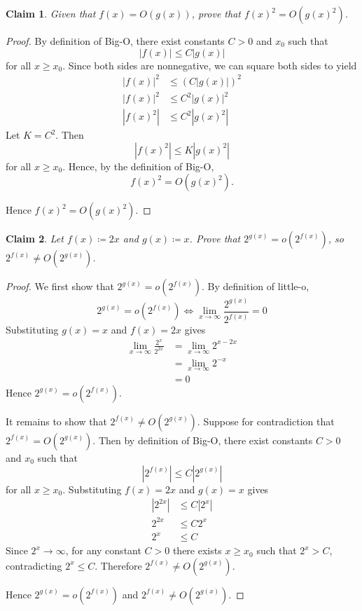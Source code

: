 \documentclass{article}
\newtheorem{claim}{Claim}
\begin{document}
\begin{claim}
    Given that $f(x) = O(g(x))$, prove that $f(x)^2 = O(g(x)^2)$.
\end{claim}

\begin{proof}
    By definition of Big-O, there exist constants $C > 0$ and $x_0$ such that
    \[
    |f(x)| \leq C|g(x)|
    \]
    for all $x \geq x_0$. Since both sides are nonnegative, we can square both 
    sides to yield
    \[
    \begin{aligned}
    |f(x)|^2 &\leq (C|g(x)|)^2 \\
    |f(x)|^2 &\leq C^2|g(x)|^2 \\
    |f(x)^2| &\leq C^2|g(x)^2|
    \end{aligned}
    \]
    Let $K = C^2$. Then
    \[
    |f(x)^2| \leq K|g(x)^2|
    \]
    for all $x \geq x_0$. Hence, by the definition of Big-O,
    \[
    f(x)^2 = O(g(x)^2).
    \]

    \medskip

    Hence $f(x)^2 = O(g(x)^2)$.
\end{proof}

\begin{claim}
    Let $f(x) \coloneq 2x$ and $g(x) \coloneq x$. Prove that $2^{g(x)} = 
    o(2^{f(x)})$, so $2^{f(x)} \neq O(2^{g(x)})$.
\end{claim}

\begin{proof}
    We first show that $2^{g(x)} = o(2^{f(x)})$. By definition of little-o,
    \[
    2^{g(x)} = o(2^{f(x)}) \iff \lim_{x \to \infty}\frac{2^{g(x)}}{2^{f(x)}} = 0
    \]
    Substituting $g(x) = x$ and $f(x) = 2x$ gives
    \[
    \begin{aligned}
    \lim_{x \to \infty}\frac{2^x}{2^{2x}} &= \lim_{x \to \infty}2^{x - 2x} \\
    &= \lim_{x \to \infty}2^{-x} \\
    &= 0
    \end{aligned}
    \]
    Hence $2^{g(x)} = o(2^{f(x)})$.

    \medskip

    It remains to show that $2^{f(x)} \neq O(2^{g(x)})$. Suppose for contradiction 
    that $2^{f(x)} = O(2^{g(x)})$. Then by definition of Big-O, there exist 
    constants $C > 0$ and $x_0$ such that
    \[
    |2^{f(x)}| \leq C|2^{g(x)}|
    \]
    for all $x \geq x_0$. Substituting $f(x) = 2x$ and $g(x) = x$ gives
    \[
    \begin{aligned}
    |2^{2x}| &\leq C|2^x| \\
    2^{2x} &\leq C2^x \\
    2^x &\leq C
    \end{aligned}
    \]
    Since $2^x \to \infty$, for any constant $C > 0$ there exists $x \geq x_0$
    such that $2^x > C$, contradicting $2^x \leq C$. Therefore $2^{f(x)} \neq 
    O(2^{g(x)})$.

    \medskip

    Hence $2^{g(x)} = o(2^{f(x)})$ and $2^{f(x)} \neq O(2^{g(x)})$.
\end{proof}
\end{document}
